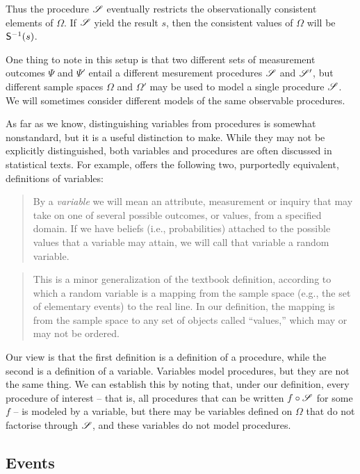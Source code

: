 Thus the procedure $\mathscr{S}$ eventually restricts the observationally consistent elements of $\Omega$. If $\mathscr{S}$ yield the result $s$, then the consistent values of $\Omega$ will be $\mathsf{S}^{-1}(s)$.

One thing to note in this setup is that two different sets of measurement outcomes $\Psi$ and $\Psi'$ entail a different mesurement procedures $\mathscr{S}$ and $\mathscr{S}'$, but different sample spaces $\Omega$ and $\Omega'$ may be used to model a single procedure $\mathscr{S}$. We will sometimes consider different models of the same observable procedures.

As far as we know, distinguishing variables from procedures is somewhat nonstandard, but it is a useful distinction to make. While they may not be explicitly distinguished, both variables and procedures are often discussed in statistical texts. For example, \citet{pearl_causality:_2009} offers the following two, purportedly equivalent, definitions of variables:
\begin{quote}
By a \emph{variable} we will mean an attribute, measurement or inquiry that may take on one of several possible outcomes, or values, from a specified domain. If we have beliefs (i.e., probabilities) attached to the possible values that a variable may attain, we will call that variable a random variable.
\end{quote}

\begin{quote}
This is a minor generalization of the textbook definition, according to which a random variable is a mapping from the sample space (e.g., the set of elementary events) to the real line. In our definition, the mapping is from the sample space to any set of objects called ``values,'' which may or may not be ordered.
\end{quote}

Our view is that the first definition is a definition of a procedure, while the second is a definition of a variable. Variables model procedures, but they are not the same thing. We can establish this by noting that, under our definition, every procedure of interest -- that is, all procedures that can be written $f\circ \mathscr{S}$ for some $f$ -- is modeled by a variable, but there may be variables defined on $\Omega$ that do not factorise through $\mathscr{S}$, and these variables do not model procedures.

\subsection{Events}


